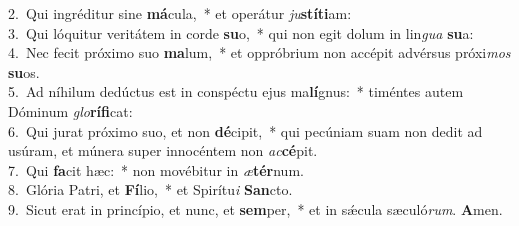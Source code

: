 {2.~}Qui ingréditur sine \textbf{má}cula,~* et operátur \textit{ju}\textbf{stí}\textbf{ti}am:\\
{3.~}Qui lóquitur veritátem in corde \textbf{su}o,~* qui non egit dolum in lin\textit{gua} \textbf{su}a:\\
{4.~}Nec fecit próximo suo \textbf{ma}lum,~* et oppróbrium non accépit advérsus próxi\textit{mos} \textbf{su}os.\\
{5.~}Ad níhilum dedúctus est in conspéctu ejus ma\textbf{lí}gnus:~* timéntes autem Dóminum \textit{glo}\textbf{rí}\textbf{fi}cat:\\
{6.~}Qui jurat próximo suo, et non \textbf{dé}cipit,~* qui pecúniam suam non dedit ad usúram, et múnera super innocéntem non \textit{ac}\textbf{cé}pit.\\
{7.~}Qui \textbf{fa}cit hæc:~* non movébitur in \textit{æ}\textbf{tér}num.\\
{8.~}Glória Patri, et \textbf{Fí}lio,~* et Spirítu\textit{i} \textbf{San}cto.\\
{9.~}Sicut erat in princípio, et nunc, et \textbf{sem}per,~* et in sǽcula sæculó\textit{rum}. \textbf{A}men.\\

